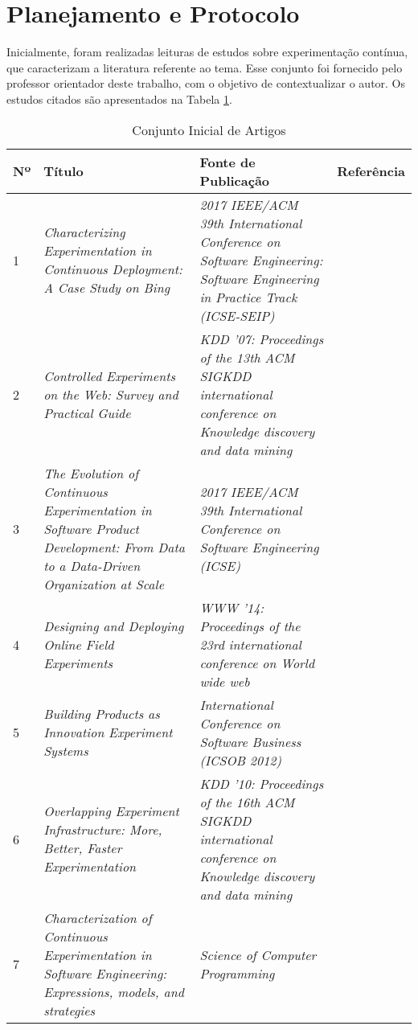 \section{Planejamento e Protocolo}
\label{sec:rsl-protocolo}

Inicialmente, foram realizadas leituras de estudos sobre experimentação contínua, que caracterizam a literatura referente ao tema. Esse conjunto foi fornecido pelo professor orientador deste trabalho, com o objetivo de contextualizar o autor. Os estudos citados são apresentados na Tabela \ref{tab:conjunto-inicial}.

\begin{table}[]
\centering
\caption{Conjunto Inicial de Artigos}
    \begin{tabular}{|p{.5cm}|p{6cm}|p{6cm}|p{1.75cm}|}
        \hline
        Nº & Título & Fonte de Publicação & Referência \\ \hline
        1 & \textit{Characterizing Experimentation in Continuous Deployment: A Case Study on Bing} & \textit{2017 IEEE/ACM 39th International Conference on Software Engineering: Software Engineering in Practice Track (ICSE-SEIP)} & \cite{kevic_characterizing_2017} \\ \hline
        2 & \textit{Controlled Experiments on the Web: Survey and Practical Guide} & \textit{KDD '07: Proceedings of the 13th ACM SIGKDD international conference on Knowledge discovery and data mining} & \cite{kohavi_controlled_2009} \\  \hline
        3 & \textit{The Evolution of Continuous Experimentation in Software Product Development: From Data to a Data-Driven Organization at Scale} & \textit{2017 IEEE/ACM 39th International Conference on Software Engineering (ICSE)} & \cite{fabijan_evolution_2017} \\ \hline
        4 & \textit{Designing and Deploying Online Field Experiments} & \textit{WWW '14: Proceedings of the 23rd international conference on World wide web} & \cite{bakshy_designing_2014} \\ \hline
        5 & \textit{Building Products as Innovation Experiment Systems} & \textit{International Conference on Software Business (ICSOB 2012)} & \cite{van_der_aalst_building_2012} \\ \hline
        6 & \textit{Overlapping Experiment Infrastructure: More, Better, Faster Experimentation} & \textit{KDD '10: Proceedings of the 16th ACM SIGKDD international conference on Knowledge discovery and data mining} & \cite{tang_overlapping_2010} \\ \hline
        7 & \textit{Characterization of Continuous Experimentation in Software Engineering: Expressions, models, and strategies} & \textit{Science of Computer Programming} & \cite{erthal_characterization_2023} \\ \hline
    \end{tabular}

    \begin{center}
        
    \end{center}

\label{tab:conjunto-inicial}
\end{table}   

